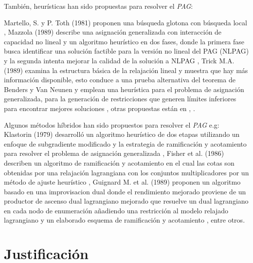 \documentclass[letterpaper,10pt]{article}
\begin{document}
También, heurísticas han sido propuestas para resolver el \emph{PAG}:
\newline

Martello, S. y P. Toth (1981) proponen una búsqueda glotona con búsqueda local \cite{4358754}, Mazzola (1989) describe una asignación generalizada con interacción de capacidad no lineal y un algoritmo heurístico en dos fases, donde la primera fase busca identificar una solución factible para la versión no lineal del PAG (NLPAG) y la segunda intenta mejorar la calidad de la solución a NLPAG  \cite{4358754}, Trick M.A. (1989) examina la estructura básica de la relajación lineal y muestra que hay más información disponible, esto conduce a una prueba alternativa del teorema de Benders y Van Neunen y emplean una heurística para el problema de asignación generalizada, para la generación de restricciones que generen límites inferiores para encontrar mejores soluciones \cite{4358754}, otras propuestas están en \cite{4358754}, \cite{4358754}.     
\newline

Algunos métodos híbridos han sido propuestos para resolver el \emph{PAG} e.g:
\newline 
Klastorin (1979) desarrolló un algoritmo heurístico de dos etapas utilizando un enfoque de subgradiente modificado y la estrategia de ramificación y acotamiento para resolver el problema de asignación generalizada \cite{4358754}, Fisher et al. (1986) describen un algoritmo de ramificación y acotamiento en el cual las cotas son obtenidas por una relajación lagrangiana con los conjuntos multiplicadores por un método de ajuste heurístico \cite{4358754}, Guignard M. et al. (1989) proponen un algoritmo basado en una improvisacion dual donde el rendimiento mejorado proviene de un productor de ascenso dual lagrangiano mejorado que resuelve un dual lagrangiano en cada nodo de enumeración añadiendo una restricción al modelo relajado lagrangiano y un elaborado esquema de ramificación y acotamiento \cite{4358754}, entre otros.
 	
\section{Justificación}
\end{document}
